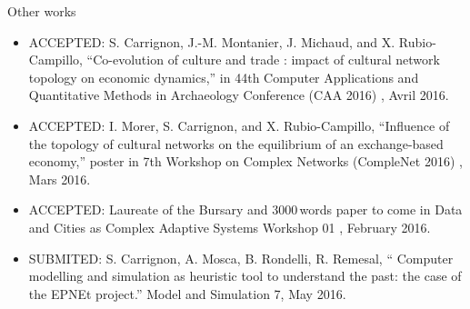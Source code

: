 \documentclass[9pt, handout=show,notes=show]{beamer}
\begin{document}
\begin{frame}{Other works}

    \begin{itemize}
	\item ACCEPTED: S. Carrignon, J.-M. Montanier, J. Michaud, and X. Rubio-Campillo, “Co-evolution of culture and trade : impact of cultural network topology on economic dynamics,” in 44th Computer Applications and Quantitative Methods in Archaeology Conference (CAA 2016) , Avril 2016.
	\item ACCEPTED: I. Morer, S. Carrignon, and X. Rubio-Campillo, “Influence of the topology of cultural networks on the equilibrium of an exchange-based economy,” poster in 7th Workshop on Complex Networks (CompleNet 2016) , Mars 2016.
	\item ACCEPTED: Laureate of the Bursary and 3000\,words paper to come in Data and Cities as Complex Adaptive Systems Workshop 01 , February 2016. 
	\item SUBMITED: S. Carrignon, A. Mosca, B. Rondelli, R. Remesal, “ Computer modelling and simulation as heuristic tool to understand the past: the case of the EPNEt project.” Model and Simulation 7, May 2016.
    \end{itemize}

\end{frame}
\end{document}
